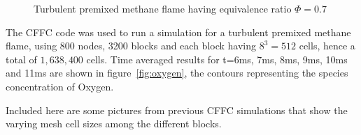 \begin{figure}[t!]
  \centering
   \:

\caption{Turbulent premixed methane flame having equivalence ratio $\Phi = 0.7$}    
 \label{fig:LES_case2}        
\end{figure}  


The CFFC code was used to run a simulation for a turbulent premixed methane flame, using 800 nodes, 3200 blocks and each block having $8^3 = 512$ cells, hence a total of $1,638,400$ cells. Time averaged results for t=6ms, 7ms, 8ms, 9ms, 10ms and 11ms are shown in figure~\ref{fig:oxygen}, the contours representing the species concentration of Oxygen.\par


Included here are some pictures from previous CFFC simulations that show the varying mesh cell sizes among the different blocks.

